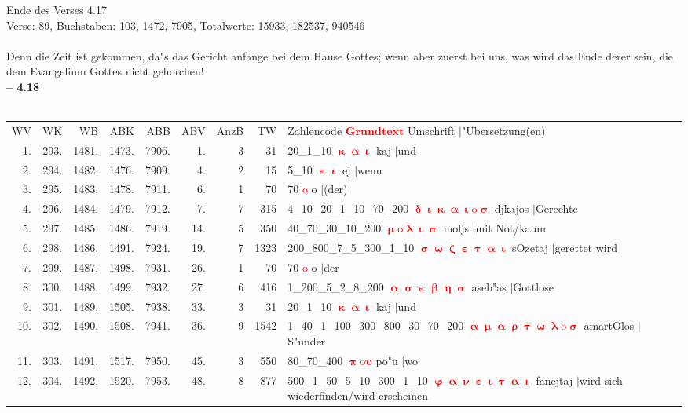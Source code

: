 \documentclass[a4paper,10pt,landscape]{article}
\begin{document}
Ende des Verses 4.17\\
Verse: 89, Buchstaben: 103, 1472, 7905, Totalwerte: 15933, 182537, 940546\\
\\
Denn die Zeit ist gekommen, da"s das Gericht anfange bei dem Hause Gottes; wenn aber zuerst bei uns, was wird das Ende derer sein, die dem Evangelium Gottes nicht gehorchen!\\
\newpage 
{\bf -- 4.18}\\
\medskip \\
\begin{tabular}{rrrrrrrrp{120mm}}
WV&WK&WB&ABK&ABB&ABV&AnzB&TW&Zahlencode \textcolor{red}{$\boldsymbol{Grundtext}$} Umschrift $|$"Ubersetzung(en)\\
1.&293.&1481.&1473.&7906.&1.&3&31&20\_1\_10 \textcolor{red}{$\boldsymbol{\upkappa\upalpha\upiota}$} kaj $|$und\\
2.&294.&1482.&1476.&7909.&4.&2&15&5\_10 \textcolor{red}{$\boldsymbol{\upepsilon\upiota}$} ej $|$wenn\\
3.&295.&1483.&1478.&7911.&6.&1&70&70 \textcolor{red}{$\boldsymbol{\mathrm{o}}$} o $|$(der)\\
4.&296.&1484.&1479.&7912.&7.&7&315&4\_10\_20\_1\_10\_70\_200 \textcolor{red}{$\boldsymbol{\updelta\upiota\upkappa\upalpha\upiota\mathrm{o}\upsigma}$} djkajos $|$Gerechte\\
5.&297.&1485.&1486.&7919.&14.&5&350&40\_70\_30\_10\_200 \textcolor{red}{$\boldsymbol{\upmu\mathrm{o}\uplambda\upiota\upsigma}$} moljs $|$mit Not/kaum\\
6.&298.&1486.&1491.&7924.&19.&7&1323&200\_800\_7\_5\_300\_1\_10 \textcolor{red}{$\boldsymbol{\upsigma\upomega\upzeta\upepsilon\uptau\upalpha\upiota}$} sOzetaj $|$gerettet wird\\
7.&299.&1487.&1498.&7931.&26.&1&70&70 \textcolor{red}{$\boldsymbol{\mathrm{o}}$} o $|$der\\
8.&300.&1488.&1499.&7932.&27.&6&416&1\_200\_5\_2\_8\_200 \textcolor{red}{$\boldsymbol{\upalpha\upsigma\upepsilon\upbeta\upeta\upsigma}$} aseb"as $|$Gottlose\\
9.&301.&1489.&1505.&7938.&33.&3&31&20\_1\_10 \textcolor{red}{$\boldsymbol{\upkappa\upalpha\upiota}$} kaj $|$und\\
10.&302.&1490.&1508.&7941.&36.&9&1542&1\_40\_1\_100\_300\_800\_30\_70\_200 \textcolor{red}{$\boldsymbol{\upalpha\upmu\upalpha\uprho\uptau\upomega\uplambda\mathrm{o}\upsigma}$} amartOlos $|$S"under\\
11.&303.&1491.&1517.&7950.&45.&3&550&80\_70\_400 \textcolor{red}{$\boldsymbol{\uppi\mathrm{o}\upsilon}$} po"u $|$wo\\
12.&304.&1492.&1520.&7953.&48.&8&877&500\_1\_50\_5\_10\_300\_1\_10 \textcolor{red}{$\boldsymbol{\upvarphi\upalpha\upnu\upepsilon\upiota\uptau\upalpha\upiota}$} fanejtaj $|$wird sich wiederfinden/wird erscheinen\\
\end{tabular}\medskip \\
\end{document}
